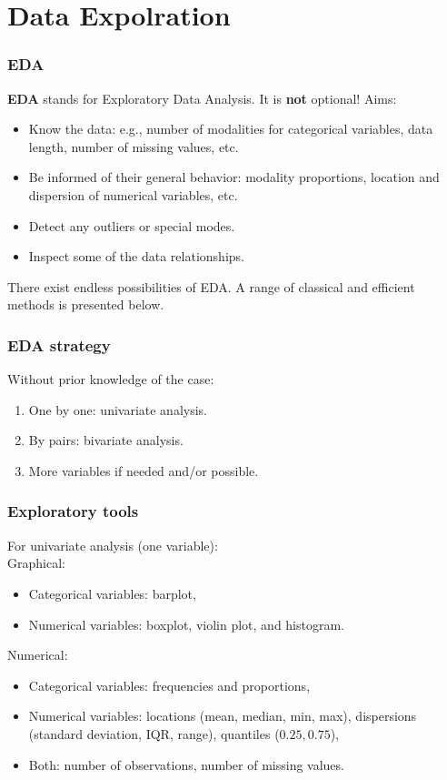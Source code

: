 \section{Data Expolration}
\begin{frame}
\frametitle{EDA}
{\bf EDA} stands for Exploratory Data Analysis. It is {\bf not} optional! Aims:
\begin{itemize}
\item Know the data: e.g., number of modalities for categorical variables, data length, number of missing values, etc.
\item Be informed of their general behavior: modality proportions, location and dispersion of numerical variables, etc.
\item Detect any outliers or special modes.
\item Inspect some of the data relationships.
\end{itemize}
There exist endless possibilities of EDA. A range of classical and efficient methods is presented below.
\end{frame}
\begin{frame}
\frametitle{EDA strategy}
Without prior knowledge of the case:
\begin{enumerate}
\item One by one: univariate analysis.
\item By pairs: bivariate analysis. 
\item More variables if needed and/or possible.
\end{enumerate}
\end{frame}
\begin{frame}
\frametitle{Exploratory tools}
For univariate analysis (one variable):\\
\vspace{0.3cm}
Graphical:
\begin{itemize}
\item Categorical variables: barplot,
\item Numerical variables: boxplot, violin plot, and histogram.
\end{itemize}
Numerical:
\begin{itemize}
\item Categorical variables: frequencies and proportions,
\item Numerical variables: locations (mean, median, min, max), dispersions (standard deviation, IQR, range), quantiles ($0.25, 0.75$),
\item Both: number of observations, number of missing values.
\end{itemize}
\end{frame}
